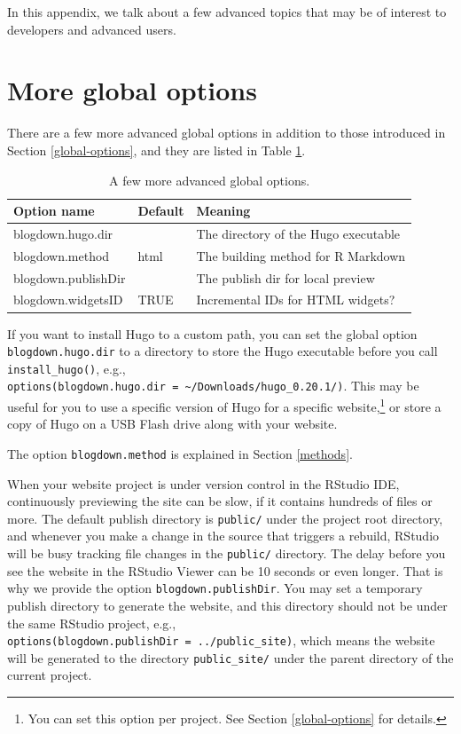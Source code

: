\documentclass[12pt,]{krantz}
\theoremstyle{definition}
\theoremstyle{definition}
\theoremstyle{definition}
\theoremstyle{remark}
\begin{document}
In this appendix, we talk about a few advanced topics that may be of
interest to developers and advanced users.

\hypertarget{more-global-options}{%
\section{More global options}\label{more-global-options}}

There are a few more advanced global options in
addition to those introduced in Section \ref{global-options}, and they
are listed in Table \ref{tab:global-options2}.

\begin{table}

\caption{\label{tab:global-options2}A few more advanced global options.}
\centering
\begin{tabular}[t]{lll}
\toprule
Option name & Default & Meaning\\
\midrule
blogdown.hugo.dir &  & The directory of the Hugo executable\\
blogdown.method & html & The building method for R Markdown\\
blogdown.publishDir &  & The publish dir for local preview\\
blogdown.widgetsID & TRUE & Incremental IDs for HTML widgets?\\
\bottomrule
\end{tabular}
\end{table}

If you want to install Hugo to a custom path, you can set the global
option \texttt{blogdown.hugo.dir} to a directory to store the Hugo
executable before you call \texttt{install\_hugo()}, e.g.,
\texttt{options(blogdown.hugo.dir\ =\ \textquotesingle{}\textasciitilde{}/Downloads/hugo\_0.20.1/\textquotesingle{})}.
This may be useful for you to use a specific version of Hugo for a
specific website,\footnote{You can set this option per project. See
  Section \ref{global-options} for details.} or store a copy of Hugo on
a USB Flash drive along with your website.

The option \texttt{blogdown.method} is explained in Section
\ref{methods}.

When your website project is under version control in the RStudio IDE,
continuously previewing the site can be slow, if it contains hundreds of
files or more. The default publish directory is \texttt{public/} under
the project root directory, and whenever you make a change in the source
that triggers a rebuild, RStudio will be busy tracking file changes in
the \texttt{public/} directory. The delay before you see the website in
the RStudio Viewer can be 10 seconds or even longer. That is why we
provide the option \texttt{blogdown.publishDir}. You may set a temporary
publish directory to generate the website, and this directory should not
be under the same RStudio project, e.g.,
\texttt{options(blogdown.publishDir\ =\ \textquotesingle{}../public\_site\textquotesingle{})},
which means the website will be generated to the directory
\texttt{public\_site/} under the parent directory of the current
project.
\end{document}

